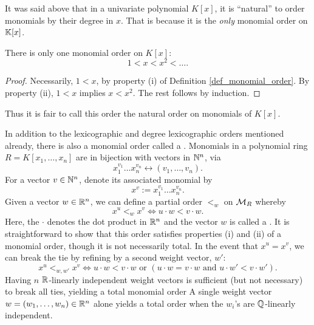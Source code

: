It was said above that in a univariate polynomial $K[x]$,
it is ``natural'' to order monomials by their degree in $x$.
That is because it is the \emph{only} monomial order on $\bb K[x]$.
\begin{proposition}
  There is only one monomial order on $K[x]$:
  \[ 1 < x < x^2 < \dots. \]
\end{proposition}
\begin{proof}
\begin{comment}
  Let $(\cal M, \leq)$ be a monomial order on powers of $x$.
  We show by induction that $x^n < x^{n+1}$ for all natural numbers $n$.

  By property (i), $1 < x$, establishing the base case, $x^0 < x^1$.
  Now suppose $x^k < x^{k+1}$ for some natural number $k \geq 0$.
  By property (ii), $x^kx < x^{k+1}x$, hence $x^{k+1} < x^{k+2}$.
\end{comment}
  Necessarily, $1 < x$, by property (i) of Definition \ref{def_monomial_order}.
  By property (ii), $1 < x$ implies $x < x^2$. The rest follows by induction.
\end{proof}
Thus it is fair to call this order the natural order on monomials of $K[x]$.

In addition to the lexicographic and degree lexicographic orders mentioned already,
there is also a monomial order called a .
Monomials in a polynomial ring $R = K[x_1, \ldots, x_n]$ are in bijection with vectors in $\bb N^n$, via
\[ x_1^{v_1} \dots x_n^{v_n} \longleftrightarrow (v_1, \ldots, v_n). \]
For a vector $v \in \bb N^n$, denote its associated monomial by 
\[ x^v := x_1^{v_1} \dots x_n^{v_n}. \]
Given a vector $w \in \bb R^n$, we can define a partial order $<_w$ on $\cal M_R$ whereby
\[ x^u <_w x^v \iff u \cdot w < v \cdot w. \]
Here, the $\cdot$ denotes the dot product in $\bb R^n$ and the vector $w$ is called a .
It is straightforward to show that this order satisfies properties (i) and (ii) of a monomial order, though it is not necessarily total.
In the event that $x^u = x^v$, we can break the tie by refining by a second weight vector, $w'$:
\[ x^u <_{w,w'} x^v \iff u \cdot w < v \cdot w \text{ or }(u \cdot w = v \cdot w \text{ and } u \cdot w' < v \cdot w'). \]
Having $n$ $\bb R$-linearly independent weight vectors is sufficient (but not necessary) to break all ties, yielding a total monomial order
A single weight vector $w = (w_1, \ldots, w_n) \in \bb R^n$ alone yields a total order when the $w_i$'s are $\bb Q$-linearly independent. 

